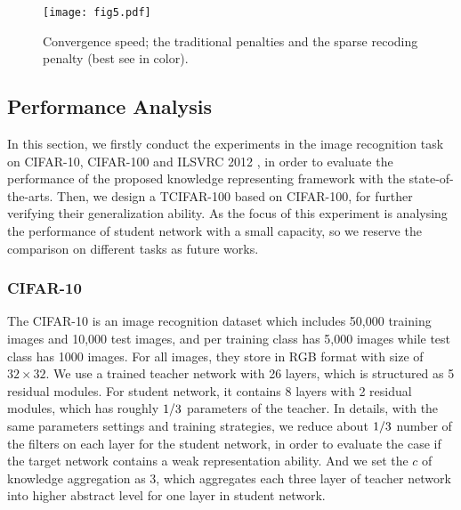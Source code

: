 \documentclass[10pt,twocolumn,letterpaper]{article}
\begin{document}
\begin{figure}[b]
  \centering
  \texttt{[image: fig5.pdf]}
  \caption{Convergence speed; the traditional penalties \cite{wen2016learning, zhang2016l1} and the sparse recoding penalty (best see in color).}                                                \label{fig:analysis_convergence}
\end{figure}

\subsection{Performance Analysis}\label{sec_performance_analysis}
In this section,
we firstly conduct the experiments
in the image recognition task
on CIFAR-10, CIFAR-100 \cite{Krizhevsky2009} and ILSVRC 2012 \cite{Deng2009},
in order to evaluate the performance of
the proposed knowledge representing framework with the state-of-the-arts.
Then,
we design a TCIFAR-100 based on CIFAR-100,
for further verifying their generalization ability.
As the focus of this experiment is analysing
the performance of student network with a small capacity,
so we reserve the comparison on different tasks as future works.

\subsubsection{CIFAR-10}
The CIFAR-10 is an image recognition dataset \cite{Krizhevsky2009}
which includes 50,000 training images and 10,000 test images,
and per training class has 5,000 images while test class has 1000 images.
For all images, they store in RGB format with size of $32 \times 32$.
We use a trained teacher network with 26 layers,
which is structured as 5 residual modules.
For student network,
it contains 8 layers with 2 residual modules,
which has roughly $1\//3$ parameters of the teacher.
In details,
with the same parameters settings and training strategies,
we reduce about $1\//3$ number of the filters on each layer for the student network,
in order to evaluate the case if the target network contains a weak representation ability.
And we set the $c$ of knowledge aggregation as 3,
which aggregates each three layer of teacher network into higher abstract level
for one layer in student network.
\end{document}

